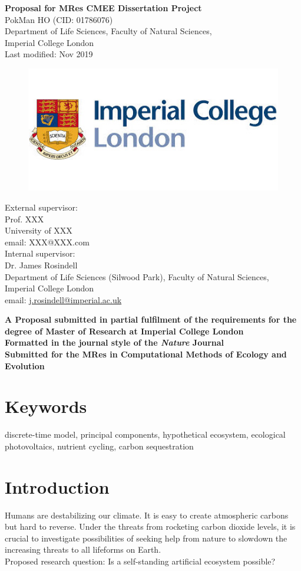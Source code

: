 \documentclass[a4paper, 11pt]{article}
\title{\ReportTitle}
\author{\ReportAuthor}
\date{}
\newcommand{\ReportTitle}{Proposal for MRes CMEE Dissertation Project}
\newcommand{\ReportAuthor}{PokMan HO (CID: 01786076)}
\newcommand{\ReportAffil}{Department of Life Sciences, Faculty of Natural Sciences,\\Imperial College London}
\newcommand{\Disclaim}{\textbf{A Proposal submitted in partial fulfilment of the requirements for the degree of Master of Research at Imperial College London\\\vspace{1cm}
		Formatted in the journal style of the \textit{Nature} Journal\\
		Submitted for the MRes in Computational Methods of Ecology and Evolution}}
\begin{document}
	\begin{center}
		\Huge\textbf{\ReportTitle}\\
		\LARGE\ReportAuthor\\
		\Large\ReportAffil\\
		\Large{Last modified: Nov 2019}
	\end{center}
	\begin{figure}[h]
		\centering\includegraphics[width=\linewidth]{icl.jpg}
	\end{figure}
External supervisor:\\
\indent Prof. XXX\\
\indent University of XXX\\
\indent email: XXX@XXX.com\\
Internal supervisor:\\
\indent Dr. James Rosindell\\
\indent Department of Life Sciences (Silwood Park), Faculty of Natural Sciences, Imperial College London\\
\indent email: \href{mailto:j.rosindell@imperial.ac.uk}{j.rosindell@imperial.ac.uk}
\begin{center}
	\Large\Disclaim
\end{center}
\clearpage
\section{Keywords}
discrete-time model, principal components, hypothetical ecosystem, ecological photovoltaics, nutrient cycling, carbon sequestration
\section{Introduction}
Humans are destabilizing our climate\autocite{schuur2015climate}.  It is easy to create atmospheric carbons but hard to reverse\autocite{yang2008progress}.  Under the threats from rocketing carbon dioxide levels, it is crucial to investigate possibilities of seeking help from nature to slowdown the increasing threats to all lifeforms on Earth.\\
Proposed research question: Is a self-standing artificial ecosystem possible?
\end{document}
